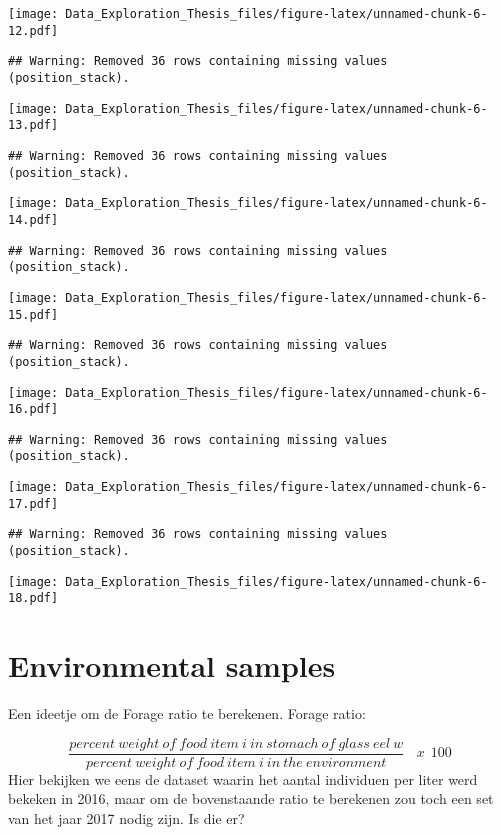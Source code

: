 \documentclass[]{article}
\begin{document}
\texttt{[image: Data\_Exploration\_Thesis\_files/figure-latex/unnamed-chunk-6-12.pdf]}

\begin{verbatim}
## Warning: Removed 36 rows containing missing values (position_stack).
\end{verbatim}

\texttt{[image: Data\_Exploration\_Thesis\_files/figure-latex/unnamed-chunk-6-13.pdf]}

\begin{verbatim}
## Warning: Removed 36 rows containing missing values (position_stack).
\end{verbatim}

\texttt{[image: Data\_Exploration\_Thesis\_files/figure-latex/unnamed-chunk-6-14.pdf]}

\begin{verbatim}
## Warning: Removed 36 rows containing missing values (position_stack).
\end{verbatim}

\texttt{[image: Data\_Exploration\_Thesis\_files/figure-latex/unnamed-chunk-6-15.pdf]}

\begin{verbatim}
## Warning: Removed 36 rows containing missing values (position_stack).
\end{verbatim}

\texttt{[image: Data\_Exploration\_Thesis\_files/figure-latex/unnamed-chunk-6-16.pdf]}

\begin{verbatim}
## Warning: Removed 36 rows containing missing values (position_stack).
\end{verbatim}

\texttt{[image: Data\_Exploration\_Thesis\_files/figure-latex/unnamed-chunk-6-17.pdf]}

\begin{verbatim}
## Warning: Removed 36 rows containing missing values (position_stack).
\end{verbatim}

\texttt{[image: Data\_Exploration\_Thesis\_files/figure-latex/unnamed-chunk-6-18.pdf]}

\section{Environmental samples}\label{environmental-samples}

Een ideetje om de Forage ratio te berekenen. Forage ratio:

\[ \frac{percent~weight~of~food~item~i~in~stomach~of~glass~eel~w}{percent~weight~of~food~item~i~in~the~environment}~~~~ x ~~ 100  \]
Hier bekijken we eens de dataset waarin het aantal individuen per liter
werd bekeken in 2016, maar om de bovenstaande ratio te berekenen zou
toch een set van het jaar 2017 nodig zijn. Is die er?
\end{document}

